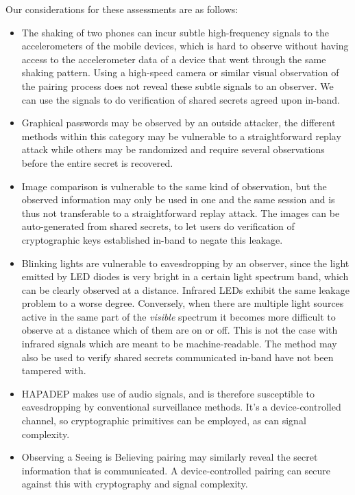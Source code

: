 \documentclass[conference, 11pt]{sty/IEEEtran}
\begin{document}
Our considerations for these assessments are as follows:
\begin{itemize}
	\item The shaking of two phones can incur subtle high-frequency signals to the accelerometers of the mobile devices, which is hard to observe without having access to the accelerometer data of a device that went through the same shaking pattern.
	Using a high-speed camera or similar visual observation of the pairing process does not reveal these subtle signals to an observer.
	We can use the signals to do verification of shared secrets agreed upon in-band.
	\item Graphical passwords may be observed by an outside attacker, the different methods within this category may be vulnerable to a straightforward replay attack while others may be randomized and require several observations before the entire secret is recovered.
	\item Image comparison is vulnerable to the same kind of observation, but the observed information may only be used in one and the same session and is thus not transferable to a straightforward replay attack.
	The images can be auto-generated from shared secrets, to let users do verification of cryptographic keys established in-band to negate this leakage.
	\item Blinking lights are vulnerable to eavesdropping by an observer, since the light emitted by LED diodes is very bright in a certain light spectrum band, which can be clearly observed at a distance.
	Infrared LEDs exhibit the same leakage problem to a worse degree.
	Conversely, when there are multiple light sources active in the same part of the \textit{visible} spectrum it becomes more difficult to observe at a distance which of them are on or off. This is not the case with infrared signals which are meant to be machine-readable.
	The method may also be used to verify shared secrets communicated in-band have not been tampered with.
	\item HAPADEP makes use of audio signals, and is therefore susceptible to eavesdropping by conventional surveillance methods. It's a device-controlled channel, so cryptographic primitives can be employed, as can signal complexity.
	\item Observing a Seeing is Believing pairing may similarly reveal the secret information that is communicated. A device-controlled pairing can secure against this with cryptography and signal complexity.
\end{itemize}
\end{document}
